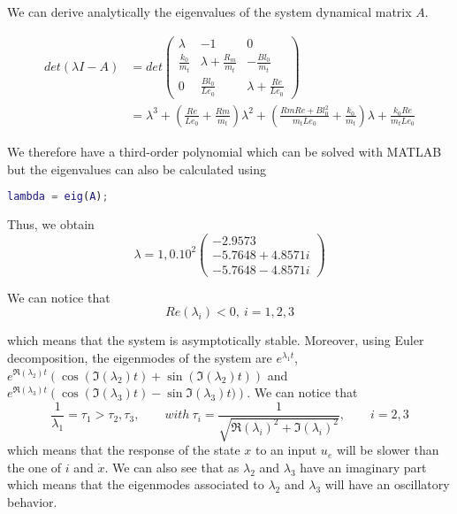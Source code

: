 We can derive analytically the eigenvalues of the system dynamical matrix $A$.

\begin{align}
	\label{eq:eigenValues}
	det(\lambda I-A) & =det\begin{pmatrix}
 \lambda & -1 & 0 \\
  \frac{k_0}{m_t} & \lambda+\frac{R_m}{m_t} & -\frac{Bl_0}{m_t} \\
  0 & \frac{Bl_0}{Le_0} & \lambda+\frac{Re}{Le_0}
\end{pmatrix} \\
& = \lambda^3 +\left(\frac{Re}{Le_0}+\frac{Rm}{m_t}\right)\lambda^2+\left(\frac{RmRe+Bl_0^2}{m_tLe_0}+\frac{k_0}{m_t}\right)\lambda+\frac{k_0Re}{m_tLe_0}
\end{align}

We therefore have a third-order polynomial which can be solved with MATLAB but the eigenvalues can also be calculated using
\begin{lstlisting}[language=Matlab]
lambda = eig(A);
\end{lstlisting}

Thus, we obtain
\begin{equation}
	\label{eq:eigenValuesValues}
	\lambda = 1,0.10^2\begin{pmatrix}
	-2.9573 \\
	-5.7648 + 4.8571i\\
	-5.7648 - 4.8571i
	\end{pmatrix}
\end{equation}

We can notice that
\begin{equation}
	\label{eq:eigenValuesRe}
	Re(\lambda_i)<0, \ i=1,2,3
\end{equation}

which means that the system is asymptotically stable. Moreover, using Euler decomposition, the eigenmodes of the system are $e^{\lambda_1t}$, $e^{\Re(\lambda_2)t}\left(\cos(\Im(\lambda_2)t)+\sin(\Im(\lambda_2)t)\right)$ and $e^{\Re(\lambda_3)t}\left(\cos(\Im(\lambda_3)t)-\sin\Im(\lambda_3)t)\right)$. We can notice that \begin{equation*}
\frac{1}{\lambda_1}=\tau_1>\tau_2, \tau_3, \qquad with\ \tau_i = \frac{1}{\sqrt{\Re(\lambda_i)^2+\Im(\lambda_i)^2}}, \qquad i = 2, 3
\end{equation*}
which means that the response of the state $x$ to an input $u_e$ will be slower than the one of $i$ and $\dot{x}$. We can also see that as $\lambda_2$ and $\lambda_3$ have an imaginary part which means that the eigenmodes associated to $\lambda_2$ and $\lambda_3$ will have an oscillatory behavior.
